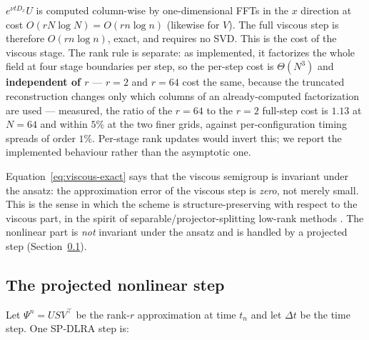 \begin{remark}
$e^{\nu t D_x} U$ is computed column-wise by one-dimensional FFTs in the $x$
direction at cost $O(r N \log N) = O(r n \log n)$ (likewise for $V$). The full
viscous step is therefore $O(r n \log n)$, exact, and requires no SVD. This
is the cost of the viscous stage. The rank rule is separate: as implemented,
it factorizes the whole field at four stage boundaries per step, so the
per-step cost is $\Theta(N^3)$ and \textbf{independent of $r$} --- $r=2$ and
$r=64$ cost the same, because the truncated reconstruction changes only which
columns of an already-computed factorization are used --- measured, the ratio of
the $r=64$ to the $r=2$ full-step cost is $1.13$ at $N=64$ and within $5\%$ at
the two finer grids, against per-configuration timing spreads of order $1\%$.
Per-stage rank updates would invert this; we report the implemented behaviour
rather than the asymptotic one.
\end{remark}

\begin{remark}
Equation~\eqref{eq:viscous-exact} says that the viscous semigroup is
invariant under the ansatz: the approximation error of the viscous step is
\emph{zero}, not merely small. This is the sense in which the scheme is
structure-preserving with respect to the viscous part, in the spirit of
separable/projector-splitting low-rank methods
\cite{koch2007, einkemmer2023, cui2026, goutaudier2026}. The nonlinear
part is \emph{not} invariant under the ansatz and is handled by a projected
step (Section~\ref{sec:proj-step}).
\end{remark}

\subsection{The projected nonlinear step}
\label{sec:proj-step}

Let $\Psi^n = USV^{\top}$ be the rank-$r$ approximation at time $t_n$ and let
$\Delta t$ be the time step. One SP-DLRA step is:


